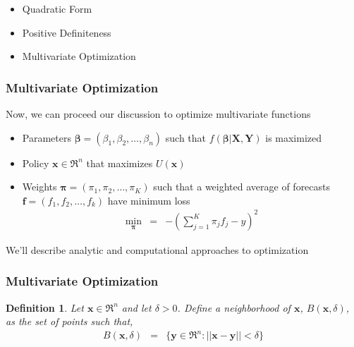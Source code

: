 \documentclass{beamer}
\newtheorem{defn}{Definition}
\numberwithin{equation}{section}
\begin{document}
\begin{frame}

\begin{itemize}
\item \textcolor{mygray}{Quadratic Form}
\item \textcolor{mygray}{Positive Definiteness}
\item \textcolor{myblack}{Multivariate Optimization}
\end{itemize}

\end{frame}



\begin{frame}
\frametitle{Multivariate Optimization}

Now, we can proceed our discussion to optimize multivariate functions \pause
\begin{itemize}
\item[-] Parameters $\boldsymbol{\beta} = (\beta_{1}, \beta_{2}, \hdots, \beta_{n} ) $ such that $f(\boldsymbol{\beta}| \boldsymbol{X}, \boldsymbol{Y})$ is maximized
\item[-] Policy $\boldsymbol{x} \in \Re^{n}$ that maximizes $U(\boldsymbol{x})$
\item[-] Weights $\boldsymbol{\pi} = (\pi_{1}, \pi_{2}, \hdots, \pi_{K})$ such that a weighted average of forecasts $\boldsymbol{f}  =  (f_{1} , f_{2}, \hdots, f_{k})$ have minimum loss 
\begin{eqnarray}
\min_{\boldsymbol{\pi}} & = & - (\sum_{j=1}^{K} \pi_{j} f_{j}  - y ) ^ 2 \nonumber 
\end{eqnarray} 
\end{itemize} \pause

We'll describe analytic and computational approaches to optimization

\end{frame}




\begin{frame}
\frametitle{Multivariate Optimization}

\begin{defn} 
Let $\boldsymbol{x} \in \Re^{n}$ and let $\delta >0$.  Define a \alert{neighborhood} of $\boldsymbol{x}$, $B(\boldsymbol{x}, \delta)$, as the set of points such that, 
\begin{eqnarray}
B(\boldsymbol{x}, \delta) & = & \{ \boldsymbol{y} \in \Re^{n} : ||\boldsymbol{x} - \boldsymbol{y}||< \delta \}  \nonumber 
\end{eqnarray}
\end{defn}

\end{frame}
\end{document}
